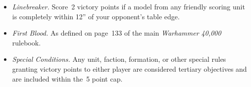 \begin{columns}
\begin{itemize}
\item \textit{Linebreaker.}  Score~2 victory points if a model from
  any friendly scoring unit is completely within 12'' of your
  opponent's table edge.

\item \textit{First Blood.}  As defined on page~133 of the main
  \emph{Warhammer 40,000} rulebook.

\item \textit{Special Conditions.}  Any unit, faction, formation, or
  other special rules granting victory points to either player are
  considered tertiary objectives and are included within the~5 point
  cap.
\end{itemize}

\end{columns}
